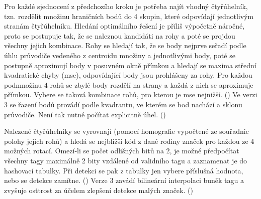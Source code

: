   Pro každé sjednocení z předchozího kroku je potřeba najít vhodný čtyřúhelník, tzn. rozdělit množinu hraničních bodů do 4 skupin, které odpovídají jednotlivým stranám čtyřúhelníku. Hledání optimálního řešení je příliš výpočetně náročné, proto se postupuje tak, že se naleznou kandidáti na rohy a poté se projdou všechny jejich kombinace. Rohy se hledají tak, že se body nejprve seřadí podle úhlu průvodiče vedeného z centroidu množiny a jednotlivými body, poté se postupně aproximují body v posuvném okně přímkou a hledají se maxima střední kvadratické chyby (\acrshort{mse}), odpovídající body jsou prohlášeny za rohy. Pro každou podmnožinu 4 rohů se zbylé body rozdělí na strany a každá z nich se aproximuje přímkou. Vybere se taková kombinace rohů, pro kterou je \acrshort{mse} nejnižší. (\cite{apriltag2}) Ve verzi 3 se řazení bodů provádí podle kvadrantu, ve kterém se bod nachází a sklonu průvodiče. Není tak nutné počítat explicitně úhel. (\cite{apriltag3})

  Nalezené čtyřúhelníky se vyrovnají (pomocí homografie vypočtené ze souřadnic polohy jejich rohů) a hledá se nejbližší kód z dané rodiny značek pro každou ze 4 možných rotací. Omezí-li se počet odlišných bitů na 2, je možné předpočítat všechny tagy maximálně 2 bity vzdálené od validního tagu a zaznamenat je do hashovací tabulky. Při detekci se pak z tabulky jen vybere příslušná hodnota, nebo se detekce zamítne. (\cite{apriltag2}) Verze 3 zavádí bilineární interpolaci buněk tagu a zvyšuje osttrost za účelem zlepšení detekce malých značek. (\cite{apriltag3})